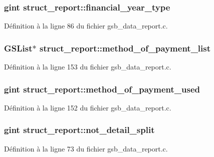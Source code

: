 \subsubsection[{financial\_\-year\_\-type}]{\setlength{\rightskip}{0pt plus 5cm}gint {\bf struct\_\-report::financial\_\-year\_\-type}}\label{structstruct__report_a2c773b8aac70162ba7341e3233a69c32}


Définition à la ligne 86 du fichier gsb\_\-data\_\-report.c.

\subsubsection[{method\_\-of\_\-payment\_\-list}]{\setlength{\rightskip}{0pt plus 5cm}GSList$\ast$ {\bf struct\_\-report::method\_\-of\_\-payment\_\-list}}\label{structstruct__report_a6fb63bec1575dfcfdaea5c905e1108e4}


Définition à la ligne 153 du fichier gsb\_\-data\_\-report.c.

\subsubsection[{method\_\-of\_\-payment\_\-used}]{\setlength{\rightskip}{0pt plus 5cm}gint {\bf struct\_\-report::method\_\-of\_\-payment\_\-used}}\label{structstruct__report_a26ff392f121c4a642e7f6ed879723dc4}


Définition à la ligne 152 du fichier gsb\_\-data\_\-report.c.

\subsubsection[{not\_\-detail\_\-split}]{\setlength{\rightskip}{0pt plus 5cm}gint {\bf struct\_\-report::not\_\-detail\_\-split}}\label{structstruct__report_a0279f83b46326ce4bc78ccc10c72c060}


Définition à la ligne 73 du fichier gsb\_\-data\_\-report.c.

